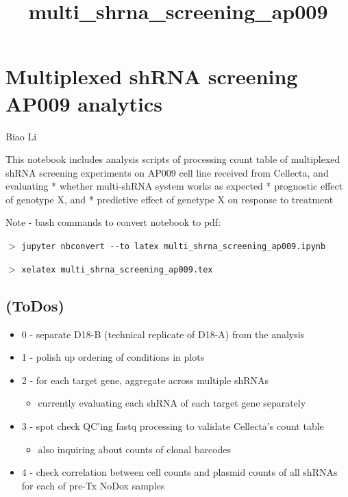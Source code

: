 \documentclass[11pt]{article}
\title{multi\_shrna\_screening\_ap009}
\providecommand{\tightlist}{%
      \setlength{\itemsep}{0pt}\setlength{\parskip}{0pt}}
\begin{document}
    
    \maketitle
    
    

    
    \section{Multiplexed shRNA screening AP009
analytics}\label{multiplexed-shrna-screening-ap009-analytics}

Biao Li

This notebook includes analysis scripts of processing count table of
multiplexed shRNA screening experiments on AP009 cell line received from
Cellecta, and evaluating * whether multi-shRNA system works as expected
* prognostic effect of genotype X, and * predictive effect of genetype X
on response to treatment

Note - bash commands to convert notebook to pdf:

\(>\)
\texttt{jupyter\ nbconvert\ -\/-to\ latex\ multi\_shrna\_screening\_ap009.ipynb}

\(>\) \texttt{xelatex\ multi\_shrna\_screening\_ap009.tex}

    \subsection{(ToDos)}\label{todos}

\begin{itemize}
\tightlist
\item
  0 - separate D18-B (technical replicate of D18-A) from the analysis
\item
  1 - polish up ordering of conditions in plots
\item
  2 - for each target gene, aggregate across multiple shRNAs

  \begin{itemize}
  \tightlist
  \item
    currently evaluating each shRNA of each target gene separately
  \end{itemize}
\item
  3 - spot check QC'ing fastq processing to validate Cellecta's count
  table

  \begin{itemize}
  \tightlist
  \item
    also inquiring about counts of clonal barcodes
  \end{itemize}
\item
  4 - check correlation between cell counts and plasmid counts of all
  shRNAs for each of pre-Tx NoDox samples
\end{itemize}
\end{document}
